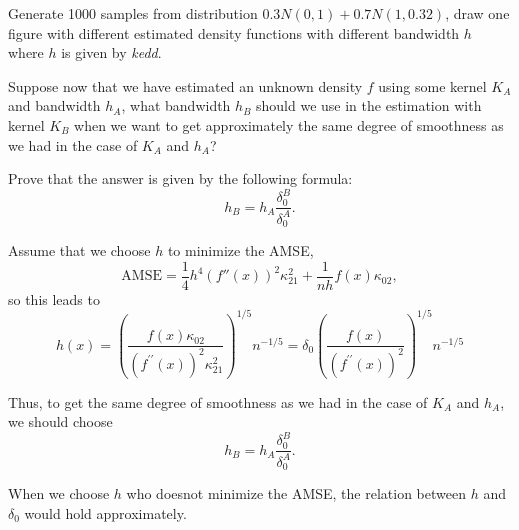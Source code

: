 \begin{problem}
    Generate 1000 samples from distribution $0.3N(0,1)+0.7N(1,0.32)$,  draw one figure with different estimated density functions with different bandwidth $h$ where $h$ is given by \emph{kedd}.
\end{problem}

\begin{problem}
    Suppose now that we have estimated an unknown density $f$ using some kernel $K_A$ and bandwidth $h_A$, what bandwidth $h_B$ should we use in the estimation with kernel $K_B$ when we want to get approximately the same degree of smoothness as we had in the case of $K_A$ and $h_A$?

    Prove that the answer is given by the following formula:
    \begin{equation*}
        h_B = h_A \frac{\delta_0^B}{\delta_0^A}.
    \end{equation*}
\end{problem}
\begin{solution}
    Assume that we choose $h$ to minimize the AMSE, 
    \begin{equation*}
        \text{AMSE} = \frac{1}{4}h^4 (f''(x))^2 \kappa_{21}^2 + \frac{1}{nh} f(x) \kappa_{02}, %
    \end{equation*}
    so this leads to 
    \begin{equation*}
        h(x)= \left(\frac{f(x) \kappa_{02}}{\left(f^{\prime \prime}(x)\right)^{2} \kappa_{21}^{2}}\right)^{1 / 5} n^{-1 / 5} = \delta_0 \left(\frac{f(x)}{\left(f^{\prime \prime}(x)\right)^{2} }\right)^{1 / 5}  n^{-1 / 5}
    \end{equation*}

    Thus, to get the same degree of smoothness as we had in the case of $K_A$ and $h_A$, we should choose
    \begin{equation*}
        h_B = h_A \frac{\delta_0^B}{\delta_0^A}.
    \end{equation*}

    When we choose $h$ who doesnot minimize the AMSE, the relation  between $h$ and $\delta_0$ would hold approximately. 
\end{solution}


